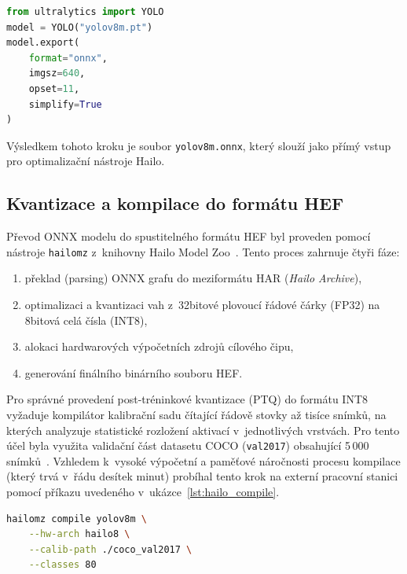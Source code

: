 
\begin{lstlisting}[language=Python, caption={Export modelu YOLOv8m do formátu ONNX.}, label={lst:onnx_export}]
from ultralytics import YOLO
model = YOLO("yolov8m.pt")
model.export(
    format="onnx",
    imgsz=640,
    opset=11,
    simplify=True
)
\end{lstlisting}

Výsledkem tohoto kroku je soubor \texttt{yolov8m.onnx}, který slouží jako přímý vstup pro optimalizační nástroje Hailo.

\subsection{Kvantizace a kompilace do formátu HEF}
Převod ONNX modelu do spustitelného formátu HEF byl proveden pomocí nástroje \texttt{hailomz} z~knihovny Hailo Model Zoo~\cite{hailo_model_zoo}. Tento proces zahrnuje čtyři fáze:
\begin{enumerate}
    \item překlad (parsing) ONNX grafu do meziformátu HAR (\textit{Hailo Archive}),
    \item optimalizaci a kvantizaci vah z~32bitové plovoucí řádové čárky (FP32) na 8bitová celá čísla (INT8),
    \item alokaci hardwarových výpočetních zdrojů cílového čipu,
    \item generování finálního binárního souboru HEF.
\end{enumerate}

Pro správné provedení post-tréninkové kvantizace (PTQ) do formátu INT8 vyžaduje kompilátor kalibrační sadu čítající řádově stovky až tisíce snímků, na kterých analyzuje statistické rozložení aktivací v~jednotlivých vrstvách. Pro tento účel byla využita validační část datasetu COCO (\texttt{val2017}) obsahující 5\,000 snímků~\cite{lin_coco_2014}. Vzhledem k~vysoké výpočetní a paměťové náročnosti procesu kompilace (který trvá v~řádu desítek minut) probíhal tento krok na externí pracovní stanici pomocí příkazu uvedeného v~ukázce~\ref{lst:hailo_compile}.

\begin{lstlisting}[language=bash, caption={Kompilace modelu YOLOv8m pomocí nástroje Hailo Model Zoo.}, label={lst:hailo_compile}]
hailomz compile yolov8m \
    --hw-arch hailo8 \
    --calib-path ./coco_val2017 \
    --classes 80
\end{lstlisting}

